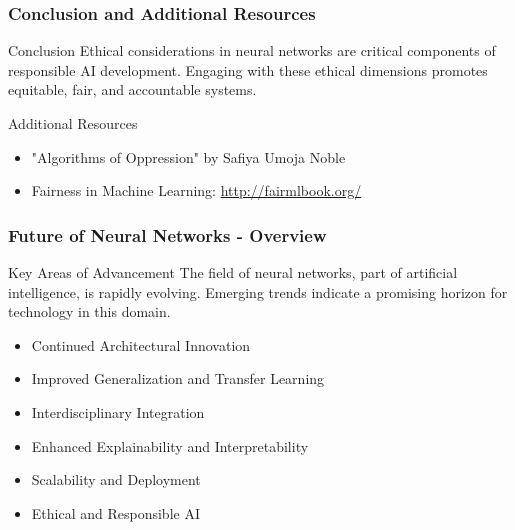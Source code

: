 \documentclass{beamer}
\begin{document}
\begin{frame}[fragile]
    \frametitle{Conclusion and Additional Resources}
    \begin{block}{Conclusion}
        Ethical considerations in neural networks are critical components of responsible AI development. Engaging with these ethical dimensions promotes equitable, fair, and accountable systems.
    \end{block}
    
    \begin{block}{Additional Resources}
        \begin{itemize}
            \item "Algorithms of Oppression" by Safiya Umoja Noble
            \item Fairness in Machine Learning: \url{http://fairmlbook.org/}
        \end{itemize}
    \end{block}
\end{frame}

\begin{frame}[fragile]
    \frametitle{Future of Neural Networks - Overview}
    \begin{block}{Key Areas of Advancement}
        The field of neural networks, part of artificial intelligence, is rapidly evolving. Emerging trends indicate a promising horizon for technology in this domain.
    \end{block}
    \begin{itemize}
        \item Continued Architectural Innovation
        \item Improved Generalization and Transfer Learning
        \item Interdisciplinary Integration
        \item Enhanced Explainability and Interpretability
        \item Scalability and Deployment
        \item Ethical and Responsible AI
    \end{itemize}
\end{frame}
\end{document}
